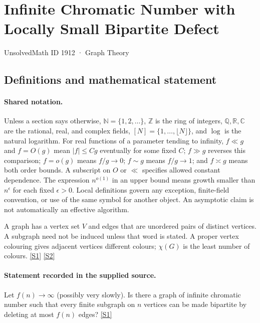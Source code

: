 \documentclass[11pt,a4paper]{article}
\newcommand{\N}{\mathbb{N}}
\newcommand{\Z}{\mathbb{Z}}
\newcommand{\Q}{\mathbb{Q}}
\newcommand{\R}{\mathbb{R}}
\newcommand{\C}{\mathbb{C}}
\newcommand{\sref}[2]{\hyperlink{source:#1:#2}{[S#2]}}
\begin{document}

\setcounter{section}{1911}

\section{Infinite Chromatic Number with Locally Small Bipartite Defect}\label{1912}

{\small\sffamily UnsolvedMath ID 1912 · Graph Theory}

\subsection{Definitions and mathematical statement}

\paragraph{Shared notation.}Unless a section says otherwise, $\N=\{1,2,\ldots\}$,
$\Z$ is the ring of integers, $\Q,\R,\C$ are the rational, real, and complex
fields, $[N]=\{1,\ldots,\lfloor N\rfloor\}$, and $\log$ is the natural
logarithm. For real functions of a parameter tending to infinity,
$f\ll g$ and $f=O(g)$ mean $|f|\leq Cg$ eventually for some fixed $C$;
$f\gg g$ reverses this comparison; $f=o(g)$ means $f/g\to0$;
$f\sim g$ means $f/g\to1$; and $f\asymp g$ means both order bounds.
A subscript on $O$ or $\ll$ specifies allowed constant dependence.
The expression $n^{o(1)}$ in an upper bound means growth smaller than
$n^\epsilon$ for each fixed $\epsilon>0$. Local definitions govern any
exception, finite-field convention, or use of the same symbol for another
object. An asymptotic claim is not automatically an effective algorithm.



A graph has a vertex set $V$ and edges that are unordered pairs of distinct vertices. A subgraph need not be induced unless that word is stated. A proper vertex colouring gives adjacent vertices different colours; $\chi(G)$ is the least number of colours. \sref{1912}{1} \sref{1912}{2}

\paragraph{Statement recorded in the supplied source.}
Let $f(n)\to \infty$ (possibly very slowly). Is there a graph of infinite chromatic number such that every finite subgraph on $n$ vertices can be made bipartite by deleting at most $f(n)$ edges? \sref{1912}{1}
\end{document}

